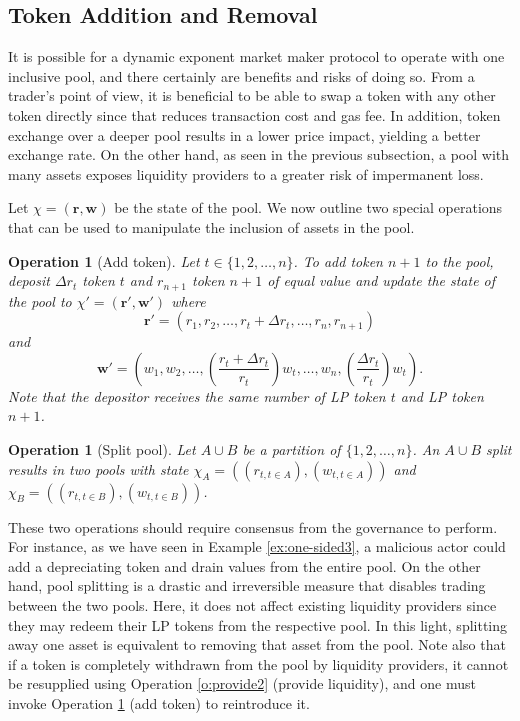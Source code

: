 \documentclass[12pt,a4paper]{article}
\newtheorem{operation}[corollary]{Operation}
\begin{document}
\subsection{Token Addition and Removal}

It is possible for a dynamic exponent market maker protocol to operate with one inclusive pool, and there certainly are benefits and risks of doing so. From a trader's point of view, it is beneficial to be able to swap a token with any other token directly since that reduces transaction cost and gas fee. In addition, token exchange over a deeper pool results in a lower price impact, yielding a better exchange rate. On the other hand, as seen in the previous subsection, a pool with many assets exposes liquidity providers to a greater risk of impermanent loss.

Let $\chi=(\mathbf{r},\mathbf{w})$ be the state of the pool. We now outline two special operations that can be used to manipulate the inclusion of assets in the pool.

\begin{operation}[Add token]\label{o:add}
Let $t\in\{1,2,\ldots,n\}$. To add token $n+1$ to the pool, deposit $\Delta r_t$ token $t$ and $r_{n+1}$ token $n+1$ of equal value and update the state of the pool to $\chi'=(\mathbf{r'},\mathbf{w'})$ where
\[\mathbf{r'}=(r_1,r_2,\ldots,r_t+\Delta r_t,\ldots,r_n,r_{n+1})\]
and
\[\mathbf{w'}=\left(w_1,w_2,\ldots,\left(\frac{r_t+\Delta r_t}{r_t}\right)w_t,\ldots,w_n,\left(\frac{\Delta r_t}{r_t}\right)w_t\right).\]
Note that the depositor receives the same number of LP token $t$ and LP token $n+1$.
\end{operation}

\begin{operation}[Split pool]
Let $A\cup B$ be a partition of $\{1,2,\ldots,n\}$. An $A\cup B$ split results in two pools with state $\chi_A=((r_{t,t\in A}),(w_{t,t\in A}))$ and $\chi_B=((r_{t,t\in B}),(w_{t,t\in B}))$.
\end{operation}

These two operations should require consensus from the governance to perform. For instance, as we have seen in Example \ref{ex:one-sided3}, a malicious actor could add a depreciating token and drain values from the entire pool. On the other hand, pool splitting is a drastic and irreversible measure that disables trading between the two pools. Here, it does not affect existing liquidity providers since they may redeem their LP tokens from the respective pool. In this light, splitting away one asset is equivalent to removing that asset from the pool. Note also that if a token is completely withdrawn from the pool by liquidity providers, it cannot be resupplied using Operation \ref{o:provide2} (provide liquidity), and one must invoke Operation \ref{o:add} (add token) to reintroduce it.
\end{document}
